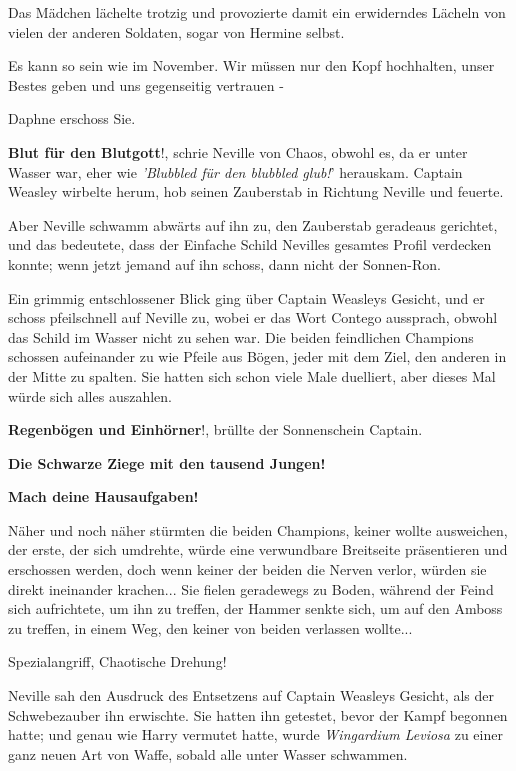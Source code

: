 Das Mädchen lächelte trotzig und provozierte damit ein erwiderndes Lächeln von
vielen der anderen Soldaten, sogar von Hermine selbst.

\glqq{}Es kann so sein wie im November. Wir müssen nur den Kopf hochhalten, unser
Bestes geben und uns gegenseitig vertrauen -\grqq{}

Daphne erschoss Sie.

\glqq{}\textbf{Blut für den Blutgott}!\grqq{}, schrie Neville von Chaos, obwohl
es, da er unter Wasser war, eher wie \emph{'Blubbled für den blubbled glub!}'
herauskam. Captain Weasley wirbelte herum, hob seinen Zauberstab in Richtung
Neville und feuerte.

Aber Neville schwamm abwärts auf ihn zu, den Zauberstab geradeaus gerichtet, und
das bedeutete, dass der Einfache Schild Nevilles gesamtes Profil verdecken
konnte; wenn jetzt jemand auf ihn schoss, dann nicht der Sonnen-Ron.

Ein grimmig entschlossener Blick ging über Captain Weasleys Gesicht, und er
schoss pfeilschnell auf Neville zu, wobei er das Wort Contego aussprach, obwohl
das Schild im Wasser nicht zu sehen war. Die beiden feindlichen Champions
schossen aufeinander zu wie Pfeile aus Bögen, jeder mit dem Ziel, den anderen in
der Mitte zu spalten. Sie hatten sich schon viele Male duelliert, aber dieses
Mal würde sich alles auszahlen.

\glqq{}\textbf{Regenbögen und Einhörner}!\grqq{}, brüllte der Sonnenschein
Captain.

\glqq{}\textbf{Die Schwarze Ziege mit den tausend Jungen!}\grqq{}

\glqq{}\textbf{Mach deine Hausaufgaben!}\grqq{}

Näher und noch näher stürmten die beiden Champions, keiner wollte ausweichen,
der erste, der sich umdrehte, würde eine verwundbare Breitseite präsentieren und
erschossen werden, doch wenn keiner der beiden die Nerven verlor, würden sie
direkt ineinander krachen... Sie fielen geradewegs zu Boden, während der Feind
sich aufrichtete, um ihn zu treffen, der Hammer senkte sich, um auf den Amboss
zu treffen, in einem Weg, den keiner von beiden verlassen wollte...

\glqq{}Spezialangriff, Chaotische Drehung!\grqq{}

Neville sah den Ausdruck des Entsetzens auf Captain Weasleys Gesicht, als der
Schwebezauber ihn erwischte. Sie hatten ihn getestet, bevor der Kampf begonnen
hatte; und genau wie Harry vermutet hatte, wurde \emph{Wingardium Leviosa} zu
einer ganz neuen Art von Waffe, sobald alle unter Wasser schwammen.

